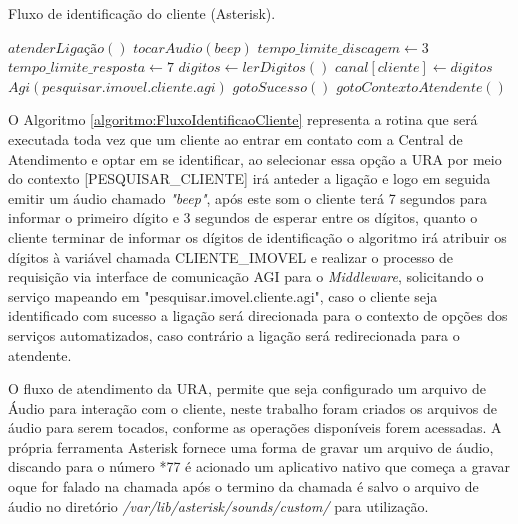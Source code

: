 
\begin{algorithm}
	\caption{Fluxo de identificação do cliente (Asterisk).}	
	\label{algoritmo:FluxoIdentificaoCliente}
	\begin{algorithmic}[1]
		\STATE $atenderLigação()$ 
		\STATE $tocarAudio(beep)$   
		\STATE $tempo\_limite\_discagem \gets 3$  		 
		\STATE $tempo\_limite\_resposta \gets 7$  
		\STATE $digitos  \gets lerDigitos()$  
		\STATE $canal [cliente]  \gets digitos$   
		\STATE $Agi(pesquisar.imovel.cliente.agi)$  
		\STATE $gotoSucesso()$  
		\ELSE
		\STATE $ gotoContextoAtendente()$  
		\ENDIF		
	\end{algorithmic}
\end{algorithm}

O Algoritmo \ref{algoritmo:FluxoIdentificaoCliente} representa a rotina que será executada toda vez que um cliente ao entrar em contato com a Central de Atendimento e optar em se identificar, ao selecionar essa opção a URA por meio do contexto [PESQUISAR\_CLIENTE] irá anteder a ligação e logo em seguida emitir um áudio chamado \textit{"beep"}, após este som o cliente terá 7 segundos para informar o primeiro dígito e 3 segundos de esperar entre os dígitos, quanto o cliente terminar de informar os dígitos de identificação o algoritmo irá atribuir os dígitos à variável chamada CLIENTE\_IMOVEL e realizar o processo de requisição via interface de comunicação AGI para o \textit{Middleware}, solicitando o serviço mapeando em "pesquisar.imovel.cliente.agi", caso o cliente seja identificado com sucesso a ligação será direcionada para o contexto de opções dos serviços automatizados, caso contrário a ligação será redirecionada para o atendente.

O fluxo de atendimento da URA, permite que seja configurado um arquivo de Áudio para interação com o cliente, neste trabalho foram criados os arquivos de áudio para serem tocados, conforme as operações disponíveis forem acessadas.
A própria ferramenta Asterisk fornece uma forma de gravar um arquivo de áudio, discando para o número *77 é acionado um aplicativo nativo que começa a gravar oque for falado na chamada após o termino da chamada é salvo o arquivo de áudio no diretório \textit{/var/lib/asterisk/sounds/custom/} para utilização.
 
